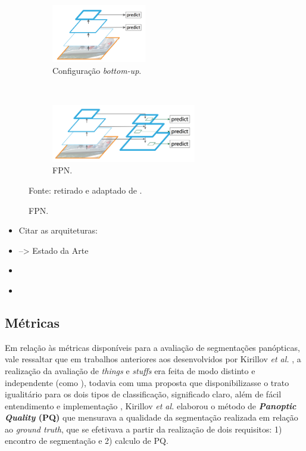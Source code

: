 \begin{figure}[H]
   \caption{Extrações de características e FPN.}
   \centering
   \label{panoptic:fig:2}
    \begin{subfigure}[t]{0.45\textwidth}
        \centering
        \includegraphics[height=1in]{recursos/imagens/bottom-up.png}
        \caption{Configuração \textit{bottom-up}.}
        \label{panoptic:fig:2.1}
    \end{subfigure}%
    ~ 
    \begin{subfigure}[t]{0.45\textwidth}
        \centering
        \includegraphics[height=1in]{recursos/imagens/FPN.png}
        \caption{FPN.}
        \label{panoptic:fig:2.2}
    \end{subfigure}%

    \vspace*{1 cm}
    Fonte: retirado e adaptado de \cite{Lin2016}.
\end{figure}
\begin{itemize}
    \item Citar as arquiteturas:
        \item \cite{Mohan2020} --> Estado da Arte
        \item \cite{DeGeus2019a}
        \item \cite{Xiong2019}
\end{itemize}

\subsection{Métricas}
\label{panoptic:metrics}
Em relação às métricas disponíveis para a avaliação de segmentações panópticas, vale ressaltar que em trabalhos anteriores aos desenvolvidos por Kirillov \textit{et al.} \cite{Kirillov2019a}, a realização da avaliação de \textit{things} e \textit{stuffs} era feita de modo distinto e independente (como \cite{Sun2014, Yao2012}), todavia com uma proposta que disponibilizasse o trato igualitário para os dois tipos de classificação, significado claro, além de fácil entendimento e implementação , Kirillov \textit{et al.} \cite{Kirillov2019a} elaborou o método de \textbf{\textit{Panoptic Quality} (PQ)} que mensurava a qualidade da segmentação realizada em relação ao \textit{ground truth}, que se efetivava  a partir da realização de dois requisitos: 1) encontro de segmentação e  2) calculo de PQ.

